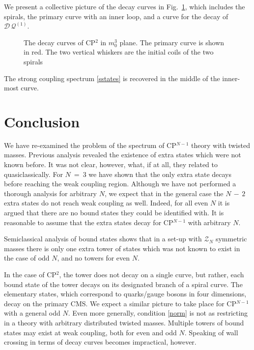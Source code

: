 \documentclass[epsfig,12pt]{article}
\newcommand{\mc}[1]{\mathcal{#1}}
\newcommand{\Q}{\mathcal{Q}}
\newcommand{\D}{\mathcal{D}}
\begin{document}
	We present a collective picture of the decay curves in Fig.~\ref{fdecays}, which includes the spirals, the 
	primary curve with an inner loop, and a curve for the decay of $ \D\,\Q^{(1)} $.
\begin{figure}
\begin{center}
\epsfxsize=8.0cm
\caption{\small The decay curves of CP$^2$ in $ m_0^3 $ plane. 
		The primary curve is shown in red.
		The two vertical whiskers are the initial coils of the two spirals}
\label{fdecays}
\end{center}
\end{figure}
	The strong coupling spectrum \eqref{sstates} is recovered in the middle of the inner-most curve.	

\newpage

\section{Conclusion}
\label{conclu}
\setcounter{equation}{0}

	We have re-examined the problem of the spectrum of CP$^{N-1}$ theory with twisted masses.
	Previous analysis \cite{Bolokhov:2011mp} revealed the existence of extra states which were not known before.
	It was not clear, however, what, if at all, they related to quasiclassically.
	For $ N ~=~ 3 $ we have shown that the only extra state decays before reaching the weak coupling region.
	Although we have not performed a thorough analysis for arbitrary $ N $, we expect 
	that in the general case the $ N \,-\, 2 $ extra states do not reach weak coupling as well.
	Indeed, for all even $ N $ it is argued that there are no bound states they could be identified with.
	It is reasonable to assume that the extra states decay for CP$^{N-1}$ with arbitrary $ N $.

	Semiclassical analysis of bound states \cite{Dorey:1998yh} shows that in a set-up
	with $ \mc{Z}_N $ symmetric masses there is only one extra tower of states which was not known to exist
	in the case of odd $ N $, and no towers for even $ N $.

	In the case of CP$^2$, the tower does not decay on a single curve, but rather, each bound state of the tower
	decays on its designated branch of a spiral curve. 
	The elementary states, which correspond to quarks/gauge bosons in four dimensions, decay on the primary CMS.
	We expect a similar picture to take place for CP$^{N-1}$ with a general odd $ N $.
	Even more generally, condition \eqref{norm} is not as restricting in a theory with arbitrary distributed 
	twisted masses.
	Multiple towers of bound states may exist at weak coupling, both for even and odd $ N $.
	Speaking of wall crossing in terms of decay curves becomes impractical, however.
\end{document}
